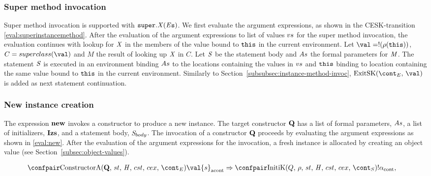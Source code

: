 \documentclass[a4paper,oneside]{article}
\newcommand{\synt}[1]{\ensuremath{\text{\textbf{#1}}}}
\DeclareMathOperator{\new}{\synt{new}}
\newcommand{\cesktrans}[2]{\ensuremath{{#1} \Rightarrow {#2}}}
\begin{document}
\subsubsection{Super method invocation}
\label{subsubsec:super-method-invoc}

Super method invocation is supported with $\tt{super}.\mathit{X}(\mathit{E}{s})$.
We first evaluate the argument expressions, as shown in the CESK-transition \eqref{eval:superinstancemethod}.
After the evaluation of the argument expressions to list of values $vs$ for the super method invocation, the evaluation continues with lookup for $\mathit{X}$ in the members of the value bound to $\tt{this}$ in the current environment.
Let $\val = \deref{(\env(\this))}$, $C = \superclass{\val}$ and $M$ the result of looking up $\mathit{X}$ in $C$.
Let $\mathit{S}$ be the statement body and $As$ the formal parameters for $\mathit{M}$.
The statement $\mathit{S}$ is executed in an environment binding $As$ to the locations containing the values in $vs$ and $\tt{this}$ binding to location containing the same value bound to $\tt{this}$ in the current environment.
Similarly to Section~\ref{subsubsec:instance-method-invoc}, $\ExitSK{\val}$ is added as next statement continuation.


\subsubsection{New instance creation}
\label{subsubsec:new-instance}

\newcommand{\Initializer}[1]{\mathrm{Initializer}(#1)}
\newcommand{\SuperInitializer}[2]{\mathrm{SuperInitializer}(#1,\,#2)}
\newcommand{\RedirectingInitializer}[2]{\mathrm{RedirectingInitializer}(#1,\,#2)}

The expression $\new$ invokes a constructor to produce a new instance.
The target constructor $\synt{Q}$ has a list of formal parameters, $As$, a list of initializers, $\synt{Izs}$, and a statement body, $\mathit{S}_{body}$.
The invocation of a constructor $\synt{Q}$ proceeds by evaluating the argument expressions as shown in \eqref{eval:new}.
After the evaluation of the argument expressions for the invocation, a fresh instance is allocated by creating an object value (see Section~\ref{subsec:object-values}).

\begin{align*}
    &\cesktrans%
        {\acontconf{\ConstructorA{\synt{Q}}{\strace}{\econt}}{\val{s}}}%
        {\contconf{\InitK{Q}{\env}{\scont}}{!\loc}},
\end{align*}
\end{document}
